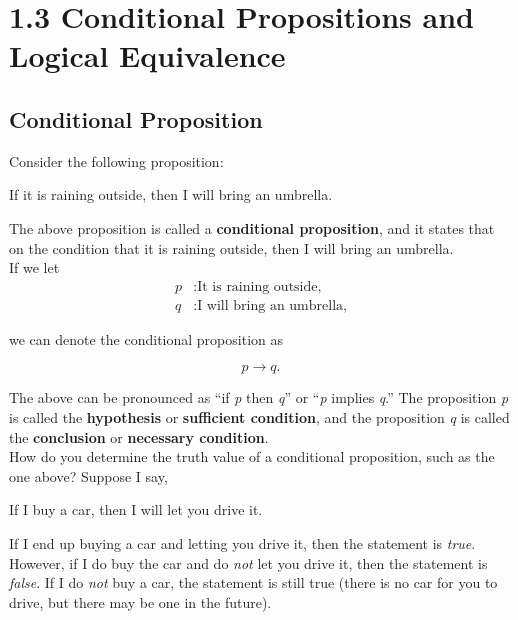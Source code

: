 \section*{1.3 Conditional Propositions and Logical Equivalence}

\subsection*{Conditional Proposition}

Consider the following proposition:

\begin{center}
If it is raining outside, then I will bring an umbrella.
\end{center}

The above proposition is called a \textbf{conditional proposition}, and it states that on the condition that it is raining outside, then I will bring an umbrella.\\

If we let
\begin{align*}
p&: \text{It is raining outside,}\\
q&: \text{I will bring an umbrella,}
\end{align*}

we can denote the conditional proposition as

\[
    p \rightarrow q.
\]

The above can be pronounced as ``if \textit{p} then \textit{q}'' or ``\textit{p} implies \textit{q}.'' The proposition \textit{p} is called the \textbf{hypothesis} or \textbf{sufficient condition}, and the proposition \textit{q} is called the \textbf{conclusion} or \textbf{necessary condition}.\\

How do you determine the truth value of a conditional proposition, such as the one above?  Suppose I say,

\begin{center}

If I buy a car, then I will let you drive it.

\end{center}

If I end up buying a car and letting you drive it, then the statement is \textit{true}.  However, if I do buy the car and do \textit{not} let you drive it, then the statement is \textit{false}.  If I do \textit{not} buy a car, the statement is still true (there is no car for you to drive, but there may be one in the future).\\  

